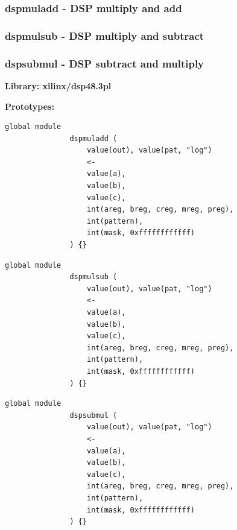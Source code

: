         \subsubsection{dspmuladd - DSP multiply and add}\label{sec:lmdspmuladd}
        \subsubsection{dspmulsub - DSP multiply and subtract}\label{sec:lmdspmulsub}
        \subsubsection{dspsubmul - DSP subtract and multiply}\label{sec:lmdspsubmul}

            {\bf Library: xilinx/dsp48.3pl}

            {\bf Prototypes:} \\
            \vsp
            \begin{lstlisting}[gobble=12, language=threepl]
               global module
               dspmuladd (
                   value(out), value(pat, "log")
                   <-
                   value(a),
                   value(b),
                   value(c),
                   int(areg, breg, creg, mreg, preg),
                   int(pattern),
                   int(mask, 0xffffffffffff)
               ) {}
            \end{lstlisting}
            \vsp
            \begin{lstlisting}[gobble=12, language=threepl]
               global module
               dspmulsub (
                   value(out), value(pat, "log")
                   <-
                   value(a),
                   value(b),
                   value(c),
                   int(areg, breg, creg, mreg, preg),
                   int(pattern),
                   int(mask, 0xffffffffffff)
               ) {}
            \end{lstlisting}
            \vsp
            \begin{lstlisting}[gobble=12, language=threepl]
               global module
               dspsubmul (
                   value(out), value(pat, "log")
                   <-
                   value(a),
                   value(b),
                   value(c),
                   int(areg, breg, creg, mreg, preg),
                   int(pattern),
                   int(mask, 0xffffffffffff)
               ) {}
            \end{lstlisting}

